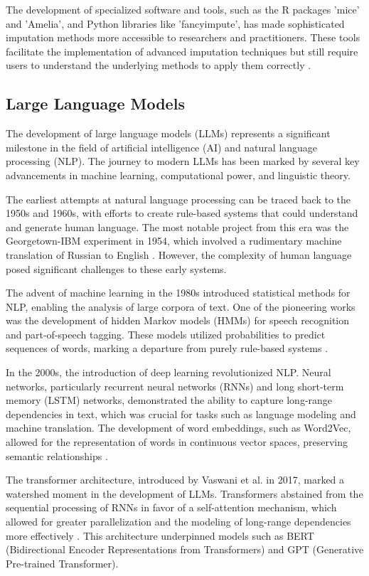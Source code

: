The development of specialized software and tools, such as the R packages 'mice' and 'Amelia', and Python libraries like 'fancyimpute', has made sophisticated imputation methods more accessible to researchers and practitioners. These tools facilitate the implementation of advanced imputation techniques but still require users to understand the underlying methods to apply them correctly \cite{Buuren2011MICEMI, Honaker2011AmeliaIA}.

\newpage
\subsection{Large Language Models}

The development of large language models (LLMs) represents a significant milestone in the field of artificial intelligence (AI) and natural language processing (NLP). The journey to modern LLMs has been marked by several key advancements in machine learning, computational power, and linguistic theory.

The earliest attempts at natural language processing can be traced back to the 1950s and 1960s, with efforts to create rule-based systems that could understand and generate human language. The most notable project from this era was the Georgetown-IBM experiment in 1954, which involved a rudimentary machine translation of Russian to English \cite{hutchins2004georgetown}. However, the complexity of human language posed significant challenges to these early systems.

The advent of machine learning in the 1980s introduced statistical methods for NLP, enabling the analysis of large corpora of text. One of the pioneering works was the development of hidden Markov models (HMMs) for speech recognition and part-of-speech tagging. These models utilized probabilities to predict sequences of words, marking a departure from purely rule-based systems \cite{rabiner1989tutorial}.

In the 2000s, the introduction of deep learning revolutionized NLP. Neural networks, particularly recurrent neural networks (RNNs) and long short-term memory (LSTM) networks, demonstrated the ability to capture long-range dependencies in text, which was crucial for tasks such as language modeling and machine translation. The development of word embeddings, such as Word2Vec, allowed for the representation of words in continuous vector spaces, preserving semantic relationships \cite{mikolov2013efficient}.

The transformer architecture, introduced by Vaswani et al. in 2017, marked a watershed moment in the development of LLMs. Transformers abstained from the sequential processing of RNNs in favor of a self-attention mechanism, which allowed for greater parallelization and the modeling of long-range dependencies more effectively \cite{vaswani2017attention}. This architecture underpinned models such as BERT (Bidirectional Encoder Representations from Transformers) and GPT (Generative Pre-trained Transformer).

